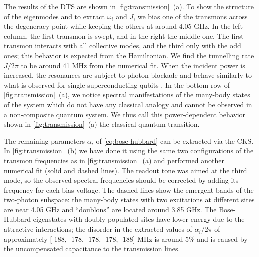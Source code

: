 \documentclass[%
 aps, prl,
 amsmath,amssymb,
 reprint,%
superscriptaddress
]{revtex4-2}
\begin{document}
The results of the DTS are shown in \autoref{fig:transmission}~(a). To show the structure of the eigenmodes and to extract $\omega_i$ and $J$, we bias one of the transmons across the degeneracy point while keeping the others at around 4.05 GHz. In the left column, the first transmon is swept, and in the right the middle one. The first transmon interacts with all collective modes, and the third only with the odd ones; this behavior is expected from the Hamiltonian. We find the tunnelling rate $J/2\pi$ to be around 41 MHz from the numerical fit. When the incident power is increased, the resonances are subject to photon blockade \cite{birnbaum2005photon} and behave similarly to what is observed for single superconducting qubits \cite{astafiev2010resonance}. In the bottom row of \autoref{fig:transmission}~(a), we notice spectral manifestations of the many-body states of the system which do not have any classical analogy and cannot be observed in a non-composite quantum system. We thus call this power-dependent behavior shown in \autoref{fig:transmission}~(a) the classical-quantum transition. 


The remaining parameters $\alpha_i$ of \autoref{eq:bose-hubbard} can be extracted via the CKS. In \autoref{fig:transmission}~(b) we have done it using the same two configurations of the transmon frequencies as in \autoref{fig:transmission}~(a) and performed another numerical fit (solid and dashed lines). The readout tone was aimed at the third mode, so the observed spectral frequencies should be corrected by adding its frequency for each bias voltage. The dashed lines show the emergent bands of the two-photon subspace: the many-body states with two excitations at different sites are near 4.05 GHz and ``doublons'' \cite{gorlach2018simulation} are located around 3.85 GHz. The Bose-Hubbard eigenstates with doubly-populated sites have lower energy due to the attractive interactions; the disorder in the extracted values of $\alpha_i/2\pi$ of approximately [-188, -178, -178, -178, -188] MHz is around 5\% and is caused by the uncompensated capacitance to the transmission lines. 
\end{document}

